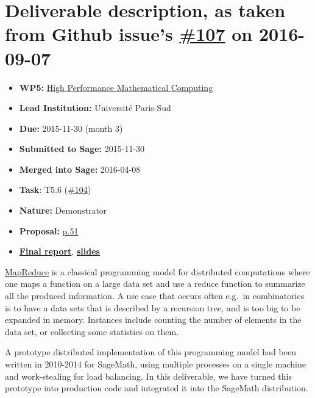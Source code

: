 \section*{\texorpdfstring{Deliverable description, as taken from Github
issue's
\href{https://github.com/OpenDreamKit/OpenDreamKit/issues/107}{\#107} on
2016-09-07}{Deliverable description, as taken from Github issue's \#107 on 2016-09-07}}\label{deliverable-description-as-taken-from-github-issues-107-on-2016-09-07}

\begin{itemize}
\tightlist
\item
  \textbf{WP5:}
  \href{https://github.com/OpenDreamKit/OpenDreamKit/tree/master/WP5}{High
  Performance Mathematical Computing}
\item
  \textbf{Lead Institution:} Université Paris-Sud
\item
  \textbf{Due:} 2015-11-30 (month 3)
\item
  \textbf{Submitted to Sage:} 2015-11-30
\item
  \textbf{Merged into Sage:} 2016-04-08
\item
  \textbf{Task}: T5.6
  (\href{https://github.com/OpenDreamKit/OpenDreamKit/issues/104}{\#104})
\item
  \textbf{Nature:} Demonstrator
\item
  \textbf{Proposal:}
  \href{https://github.com/OpenDreamKit/OpenDreamKit/raw/master/Proposal/proposal-www.pdf}{p.51}
\item
  \textbf{\href{https://github.com/OpenDreamKit/OpenDreamKit/raw/master/WP5/D5.1/report-final.pdf}{Final
  report}},
  \textbf{\href{https://github.com/OpenDreamKit/OpenDreamKit/raw/master/WP5/D5.1/slides-final.pdf}{slides}}
\end{itemize}

\href{https://en.wikipedia.org/wiki/MapReduce}{MapReduce} is a classical
programming model for distributed computations where one maps a function
on a large data set and use a reduce function to summarize all the
produced information. A use case that occurs often e.g.~in combinatorics
is to have a data sets that is described by a recursion tree, and is too
big to be expanded in memory. Instances include counting the number of
elements in the data set, or collecting some statistics on them.

A prototype distributed implementation of this programming model had
been written in 2010-2014 for SageMath, using multiple processes on a
single machine and work-stealing for load balancing. In this
deliverable, we have turned this prototype into production code and
integrated it into the SageMath distribution.

